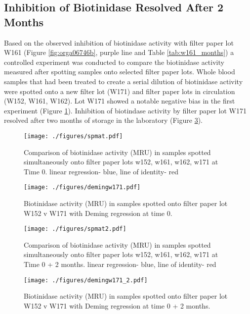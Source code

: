 \documentclass[review]{elsarticle}
\begin{document}
\subsection*{Inhibition of Biotinidase Resolved After 2 Months}
\label{sec:orgab9fb51}
Based on the observed inhibition of biotinidase activity with filter
paper lot W161 (Figure \ref{fig:orga06746b}, purple line and Table
\ref{tab:w161_months}) a controlled experiment was conducted to
compare the biotinidase activity measured after spotting samples onto
selected filter paper lots. Whole blood samples that had been treated
to create a serial dilution of biotinidase activity were spotted onto
a new filter lot (W171) and filter paper lots in circulation (W152,
W161, W162). Lot W171 showed a notable negative bias in the first experiment (Figure
\ref{fig:orgee77d55}). Inhibition of biotindase activity by filter paper lot W171
resolved after two months of storage in the laboratory (Figure
\ref{fig:orgef7511f}).

\begin{figure}[htbp]
\centering
\texttt{[image: ./figures/spmat.pdf]}
\caption{\label{fig:orgee77d55}Comparison of biotinidase activity (MRU) in samples spotted simultaneously onto filter paper lots w152, w161, w162, w171 at Time 0. linear regression- blue, line of identity- red}
\end{figure}

\begin{figure}[htbp]
\centering
\texttt{[image: ./figures/demingw171.pdf]}
\caption{\label{fig:org794ed92}Biotinidase activity (MRU) in samples spotted onto filter paper lot W152 v W171 with Deming regression at time 0.}
\end{figure}
\clearpage

\begin{figure}[htbp]
\centering
\texttt{[image: ./figures/spmat2.pdf]}
\caption{\label{fig:orgef7511f}Comparison of biotinidase activity (MRU) in samples spotted simultaneously onto filter paper lots w152, w161, w162, w171 at Time 0 + 2 months. linear regression- blue, line of identity- red}
\end{figure}

\begin{figure}[htbp]
\centering
\texttt{[image: ./figures/demingw171\_2.pdf]}
\caption{\label{fig:org89496ea}Biotinidase activity (MRU) in samples spotted onto filter paper lot W152 v W171 with Deming regression at time 0 + 2 months.}
\end{figure}
\end{document}
